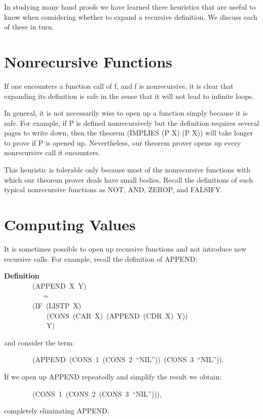 \documentclass[10pt]{book}
\newenvironment{pubasis}{\begin{flushleft}}{\end{flushleft}}
\newcommand{\axiomordefinition}[1]{\vspace{6pt}\Large\textsf{\textbf{#1}}\normalsize}
\begin{document}
In studying many hand proofs we have learned three heuristics that
are useful to know when considering whether to expand a recursive definition.
We  discuss each of these in turn.

\section{Nonrecursive Functions}
If one encounters a function call of f, and f is  nonrecursive,
it is clear that expanding its definition is safe in the sense that
it will not lead to infinite loops.

In general, it is not necessarily wise to open up a function
simply because it is safe.  For example, if P is defined nonrecursively
but the definition requires several pages to write down, then the
theorem (IMPLIES (P X) (P X)) will take longer to prove if P is opened up.
Nevertheless, our theorem prover opens up every nonrecursive call
it encounters.

This heuristic is tolerable only because most of
the nonrecursive functions with which
our theorem prover deals have small bodies.  Recall the definitions
of such typical nonrecursive functions as NOT, AND, ZEROP, and FALSIFY.

\section{Computing Values}
It is sometimes possible to open up recursive functions and not introduce
new recursive calls.  For example, recall the definition of APPEND:
\begin{pubasis}
\axiomordefinition{Definition}\\
~~~~~~~~(APPEND~X~Y)\\
~~~~~~~~~~~=\\
~~~~~~~~(IF~(LISTP~X)\\
~~~~~~~~~~~~(CONS~(CAR~X)~(APPEND~(CDR~X)~Y))\\
~~~~~~~~~~~~Y)\\
\end{pubasis}
and consider the term:

\begin{pubasis}
~~~~~~~~(APPEND~(CONS~1~(CONS~2~``NIL''))~(CONS~3~``NIL'')).\\
\end{pubasis}
If we  open up APPEND repeatedly and simplify the result
we obtain:
\begin{pubasis}
~~~~~~~~(CONS~1~(CONS~2~(CONS~3~``NIL''))),\\
\end{pubasis}
completely eliminating APPEND.
\end{document}
